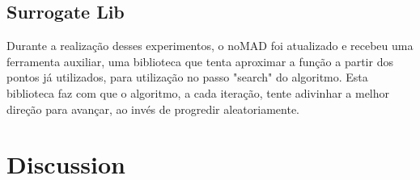 \subsection{Surrogate Lib}

Durante a realização desses experimentos, o noMAD foi atualizado e recebeu uma ferramenta auxiliar, uma biblioteca que tenta aproximar a função a partir dos pontos já utilizados, para utilização no passo "search" do algoritmo. Esta biblioteca faz com que o algoritmo, a cada iteração, tente adivinhar a melhor direção para avançar, ao invés de progredir aleatoriamente.



\section{Discussion}





